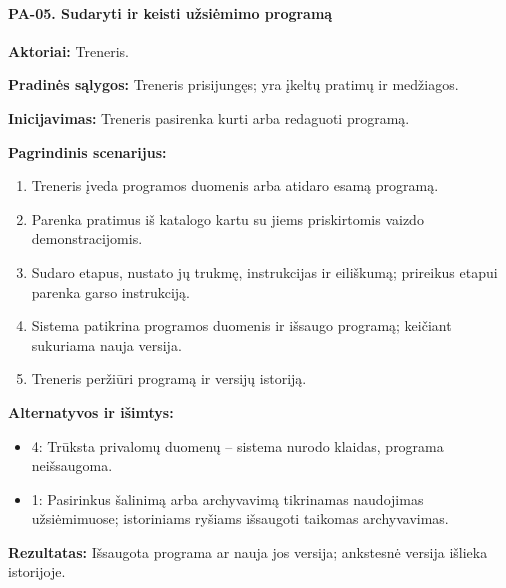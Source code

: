 \paragraph{PA-05. Sudaryti ir keisti užsiėmimo programą}\mbox{}\par
\textbf{Aktoriai:} Treneris.\par
\textbf{Pradinės sąlygos:} Treneris prisijungęs; yra įkeltų pratimų ir medžiagos.\par
\textbf{Inicijavimas:} Treneris pasirenka kurti arba redaguoti programą.\par
\textbf{Pagrindinis scenarijus:}
\begin{enumerate}
\item Treneris įveda programos duomenis arba atidaro esamą programą.
\item Parenka pratimus iš katalogo kartu su jiems priskirtomis vaizdo demonstracijomis.
\item Sudaro etapus, nustato jų trukmę, instrukcijas ir eiliškumą; prireikus etapui parenka garso instrukciją.
\item Sistema patikrina programos duomenis ir išsaugo programą; keičiant sukuriama nauja versija.
\item Treneris peržiūri programą ir versijų istoriją.
\end{enumerate}
\textbf{Alternatyvos ir išimtys:}
\begin{itemize}
\item 4: Trūksta privalomų duomenų -- sistema nurodo klaidas, programa neišsaugoma.
\item 1: Pasirinkus šalinimą arba archyvavimą tikrinamas naudojimas užsiėmimuose; istoriniams ryšiams išsaugoti taikomas archyvavimas.
\end{itemize}
\textbf{Rezultatas:} Išsaugota programa ar nauja jos versija; ankstesnė versija išlieka istorijoje.\par
{}

